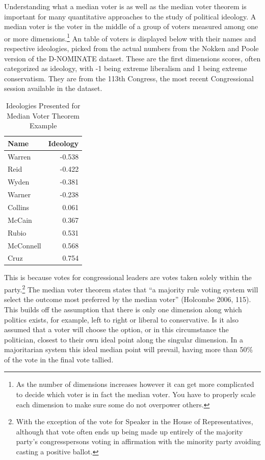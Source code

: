 \documentclass[12pt,twoside]{reedthesis}
\begin{document}
  Understanding what a median voter is as well as the median voter theorem
  is important for many quantitative approaches to the study of political
  ideology. A median voter is the voter in the middle of a group of voters
  measured among one or more
  dimensions.\footnote{As the number of dimensions increases however it can get more complicated to decide which voter is in fact the median voter. You have to properly scale each dimension to make sure some do not overpower others.}
  An table of voters is displayed below with their names and respective
  ideologies, picked from the actual numbers from the Nokken and Poole
  version of the D-NOMINATE dataset. These are the first dimensions
  scores, often categorized as ideology, with -1 being extreme liberalism
  and 1 being extreme conservatism. They are from the 113th Congress, the
  most recent Congressional session available in the dataset.
  
  \begin{table}[]
  \centering
  \caption{Ideologies Presented for Median Voter Theorem Example}
  \begin{tabular}{l|r}
  Name      & Ideology \\ \hline
  Warren    & -0.538   \\
  Reid      & -0.422   \\
  Wyden     & -0.381   \\
  Warner    & -0.238   \\
  Collins   & 0.061    \\
  McCain    & 0.367    \\
  Rubio     & 0.531    \\
  McConnell & 0.568    \\
  Cruz      & 0.754   
  \end{tabular}
  \end{table}
  
  This is because votes for congressional leaders are votes taken solely
  within the party.\footnote{With the exception of the vote for Speaker in
    the House of Representatives, although that vote often ends up being
    made up entirely of the majority party's congresspersons voting in
    affirmation with the minority party avoiding casting a positive
    ballot.} The median voter theorem states that ``a majority rule voting
  system will select the outcome most preferred by the median voter''
  (Holcombe 2006, 115). This builds off the assumption that there is only
  one dimension along which politics exists, for example, left to right or
  liberal to conservative. Is it also assumed that a voter will choose the
  option, or in this circumstance the politician, closest to their own
  ideal point along the singular dimension. In a majoritarian system this
  ideal median point will prevail, having more than 50\% of the vote in
  the final vote tallied.
  
\end{document}
